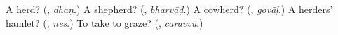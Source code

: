 \begin{tcolorbox}[breakable,colback=teal!4,colframe=teal!35!black,title={Before you move on}]
A herd? (\textbf{}, \emph{dhaṇ}.) A shepherd? (\textbf{}, \emph{bharvāḍ}.) A cowherd? (\textbf{}, \emph{govāḷ}.) A herders' hamlet? (\textbf{}, \emph{nes}.) To take to graze? (\textbf{}, \emph{carāvvũ}.)
\end{tcolorbox}

